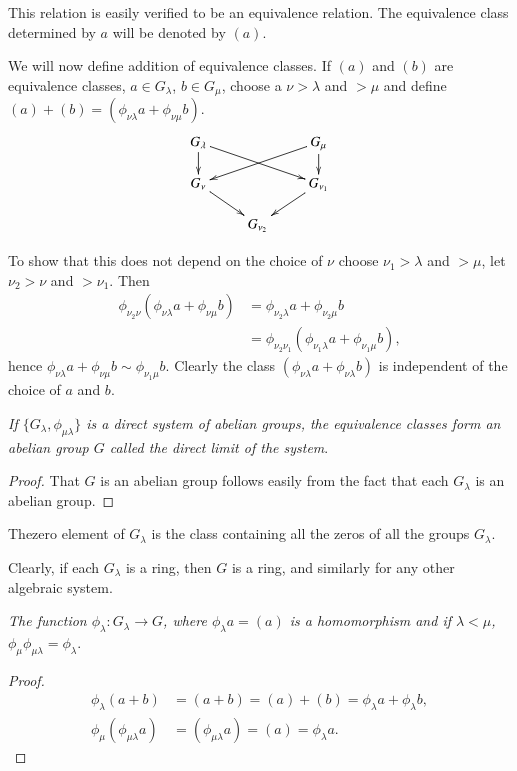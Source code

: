 This relation is easily verified to be an equivalence relation. The
equivalence class determined by $a$ will be denoted by $(a)$. 

We will now define addition of equivalence classes. If $(a)$ and $(b)$ 
are equivalence classes, $a \in G_\lambda$, $b \in G_\mu$, choose a $\nu
>  \lambda$ and $> \mu$ and define $(a) + (b) = (\phi_{\nu\lambda} a +
\phi_{\nu\mu}b)$. 
\[
\xymatrix@R=0.5cm{
G_{\lambda} \ar[d]\ar[drr] & & G_{\mu}\ar[d] \ar[dll]\\
G_{\nu} \ar[dr] & & G_{\nu_1}\ar[dl]\\
& G_{\nu_2} & 
}
\]

To show that this does not depend on the choice of
$\nu$ choose $\nu_1 > \lambda$ and $> \mu$, let $\nu_2 > \nu$ and $> 
\nu_1$. Then 
\begin{align*}
\phi_{\nu_2 \nu} (\phi_{\nu\lambda}  a + \phi_{\nu\mu}  b) & =
\phi_{\nu_2 \lambda}  a + \phi_{\nu_2 \mu }  b\\ 
& = \phi_{\nu_2\nu_1} (\phi_{\nu_1\lambda}  a + \phi_{\nu_1 \mu}  b),
\end{align*}
hence $\phi_{\nu\lambda}  a + \phi_{\nu\mu} b \sim \phi_{\nu_1\mu}
 b$. Clearly the class $(\phi_{\nu\lambda}  a + \phi_{\nu\lambda} b)$
 is independent of the choice of $a$ and $b$.  

\textit{If $\{ G_{\lambda}, \phi_{\mu\lambda}\}$ is a direct system of
  abelian groups, the equivalence classes form an abelian group $G$
  called the direct limit of the system}. 

\begin{proof}
That $G$ is an abelian group follows easily from the fact that each
$G_{\lambda}$ is an abelian group. 
\end{proof}

The\pageoriginale zero element of $G_{\lambda}$ is the class
containing all the zeros of all the groups $G_{\lambda}$.   

Clearly, if each $G_{\lambda}$ is a ring, then $G$ is a ring, and
similarly for any other algebraic system. 

\textit{The function $\phi_{\lambda} : G_{\lambda} \rightarrow G$, where
  $\phi_{\lambda} a = (a)$ is a homomorphism and if $\lambda < \mu$,
  $\phi_{\mu} \phi_{\mu\lambda} = \phi_\lambda$}. 

\begin{proof} 
\begin{align*}
\phi_\lambda (a + b) & =  (a + b) = (a) + (b) = \phi_\lambda a +
\phi_\lambda b,\\ 
\phi_{\mu}(\phi_{\mu\lambda} a) & = (\phi_{\mu\lambda}  a) = (a) =
\phi_{\lambda}  a. 
\end{align*}
\end{proof}

